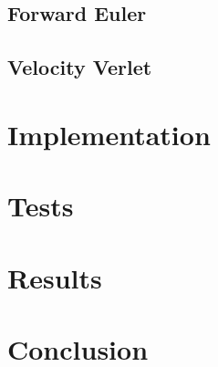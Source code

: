 \documentclass[prb,aps,twocolumn,showpacs,10pt]{revtex4-1}
\begin{document}
\subsection{Forward Euler}
\subsection{Velocity Verlet}

\section{Implementation}


\section{Tests}

\section{Results}

\section{Conclusion}
\end{document}
